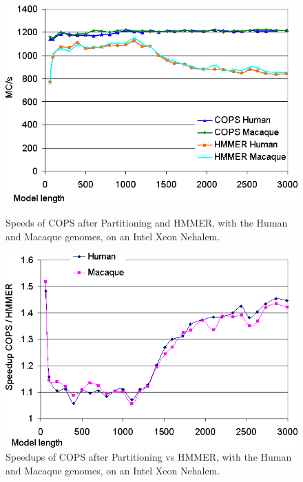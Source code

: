 \begin{figure}[H]
    \begin{minipage}{0.48\linewidth}
		\centering
		\includegraphics[scale=0.46]{graphics/partitions-tags-runtimes.png}
		\caption[Speeds for the Inter-task vectorization on an Intel Xeon Nehalem] 
		{Speeds of COPS after Partitioning and HMMER, with the Human and Macaque genomes, on an Intel Xeon Nehalem.}
		\label{partitions-tags-runtimes}
    \end{minipage}
    \hspace{0.04\linewidth}
    \begin{minipage}{0.48\linewidth}
		\centering
		\includegraphics[scale=0.46]{graphics/partitions-tags-speedups.png}
		\caption[Speedups for the Inter-task vectorization on an Intel Xeon Nehalem] 
		{Speedups of COPS after Partitioning vs HMMER, with the Human and Macaque genomes, on an Intel Xeon Nehalem.}
		\label{partitions-tags-speedups}
    \end{minipage}
\end{figure} 


